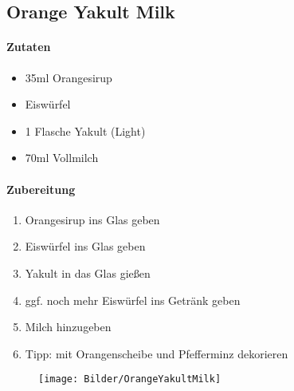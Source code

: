 \newpage
\subsection{Orange Yakult Milk}
\paragraph{Zutaten}
\begin{itemize}[noitemsep]
	\item 35ml Orangesirup
	\item Eiswürfel
	\item 1 Flasche Yakult (Light)
	\item 70ml Vollmilch
\end{itemize}
\paragraph{Zubereitung}
\begin{enumerate}[noitemsep]
	\item Orangesirup ins Glas geben
	\item Eiswürfel ins Glas geben
	\item Yakult in das Glas gießen
	\item ggf. noch mehr Eiswürfel ins Getränk geben
	\item Milch hinzugeben
	\item Tipp: mit Orangenscheibe und Pfefferminz dekorieren
\end{enumerate}
\vspace{0.5cm}
\begin{figure}[h]
\centering
\texttt{[image: Bilder/OrangeYakultMilk]}
\end{figure}